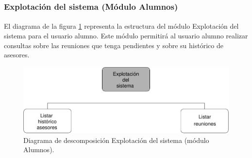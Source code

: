 \subsubsection{Explotación del sistema (Módulo Alumnos)}

  \paragraph{}El diagrama de la figura
  \ref{diagramaDescomposicionExplotacionSistema-alumnos} representa la
  estructura del módulo Explotación del sistema para el usuario alumno. Este
  módulo permitirá al usuario alumno realizar consultas sobre las reuniones que
  tenga pendientes y sobre su histórico de asesores.

  \begin{figure}[!ht]
    \begin{center}
      \includegraphics[]{11.Disenyo_Arquitectonico/11.2.Diagramas_Descomposicion/11.2.5.Modulo_alumnos/ExplotacionSistema/Diagramas/explotacion_sistema.pdf}
      \caption{Diagrama de descomposición Explotación del sistema (módulo Alumnos).}
      \label{diagramaDescomposicionExplotacionSistema-alumnos}
    \end{center}
  \end{figure}